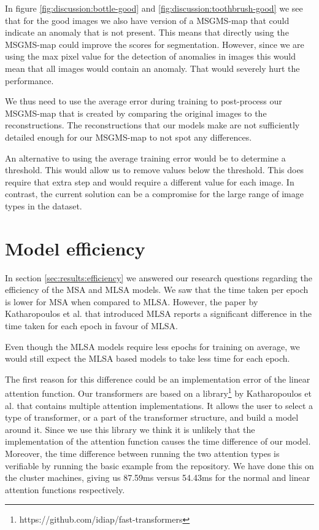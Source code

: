 In figure \ref{fig:discussion:bottle-good} and \ref{fig:discussion:toothbrush-good} we see that for the good images we also have version of a MSGMS-map that could indicate an anomaly that is not present. This means that directly using the MSGMS-map could improve the scores for segmentation. However, since we are using the max pixel value for the detection of anomalies in images this would mean that all images would contain an anomaly. That would severely hurt the performance.

We thus need to use the average error during training to post-process our MSGMS-map that is created by comparing the original images to the reconstructions. The reconstructions that our models make are not sufficiently detailed enough for our MSGMS-map to not spot any differences.

An alternative to using the average training error would be to determine a threshold. This would allow us to remove values below the threshold. This does require that extra step and would require a different value for each image. In contrast, the current solution can be a compromise for the large range of image types in the dataset.

\section{Model efficiency}

In section \ref{sec:results:efficiency} we answered our research questions regarding the efficiency of the MSA and MLSA models. We saw that the time taken per epoch is lower for MSA when compared to MLSA. However, the paper by Katharopoulos et al. \cite{katharopoulos_transformers_2020} that introduced MLSA reports a significant difference in the time taken for each epoch in favour of MLSA.

Even though the MLSA models require less epochs for training on average, we would still expect the MLSA based models to take less time for each epoch.

The first reason for this difference could be an implementation error of the linear attention function. Our transformers are based on a library\footnote{https://github.com/idiap/fast-transformers} by Katharopoulos et al. that contains multiple attention implementations. It allows the user to select a type of transformer, or a part of the transformer structure, and build a model around it. Since we use this library we think it is unlikely that the implementation of the attention function causes the time difference of our model. Moreover, the time difference between running the two attention types is verifiable by running the basic example from the repository. We have done this on the cluster machines, giving us 87.59ms versus 54.43ms for the normal and linear attention functions respectively.

